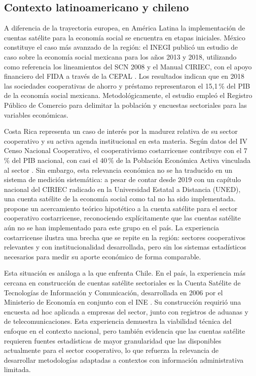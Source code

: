 \subsection{Contexto latinoamericano y chileno}

A diferencia de la trayectoria europea, en América Latina la implementación de cuentas
satélite para la economía social se encuentra en etapas iniciales. México constituye
el caso más avanzado de la región: el INEGI publicó un estudio de caso sobre la
economía social mexicana para los años 2013 y 2018, utilizando como referencia los
lineamientos del SCN 2008 y el Manual CIRIEC, con el apoyo financiero del FIDA a
través de la CEPAL \cite{ciriec-mexico_estudio_2022}. Los resultados indican que en
2018 las sociedades cooperativas de ahorro y préstamo representaron el 15{,}1\,\% del
PIB de la economía social mexicana. Metodológicamente, el estudio empleó el Registro
Público de Comercio para delimitar la población y encuestas sectoriales para las
variables económicas.

Costa Rica representa un caso de interés por la madurez relativa de su sector
cooperativo y su activa agenda institucional en esta materia. Según datos del IV Censo
Nacional Cooperativo, el cooperativismo costarricense contribuye con el 7\,\% del PIB
nacional, con casi el 40\,\% de la Población Económica Activa vinculada al sector
\cite{oibescoop_costa_2023}. Sin embargo, esta relevancia económica no se ha traducido
en un sistema de medición sistemática: a pesar de contar desde 2019 con un capítulo
nacional del CIRIEC radicado en la Universidad Estatal a Distancia (UNED), una cuenta
satélite de la economía social como tal no ha sido implementada.
\cite{castillo_arias_acercamiento_2022} propone un acercamiento teórico hipotético a
la cuenta satélite para el sector cooperativo costarricense, reconociendo
explícitamente que las cuentas satélite aún no se han implementado para este grupo en
el país. La experiencia costarricense ilustra una brecha que se repite en la región:
sectores cooperativos relevantes y con institucionalidad desarrollada, pero sin los
sistemas estadísticos necesarios para medir su aporte económico de forma comparable.

Esta situación es análoga a la que enfrenta Chile. En el país, la experiencia más
cercana en construcción de cuentas satélite sectoriales es la Cuenta Satélite de
Tecnologías de Información y Comunicación, desarrollada en 2006 por el Ministerio de
Economía en conjunto con el INE \cite{noauthor_cuenta_2006}. Su construcción requirió
una encuesta ad hoc aplicada a empresas del sector, junto con registros de aduanas y
de telecomunicaciones. Esta experiencia demuestra la viabilidad técnica del enfoque en
el contexto nacional, pero también evidencia que las cuentas satélite requieren fuentes
estadísticas de mayor granularidad que las disponibles actualmente para el sector
cooperativo, lo que refuerza la relevancia de desarrollar metodologías adaptadas a
contextos con información administrativa limitada.

